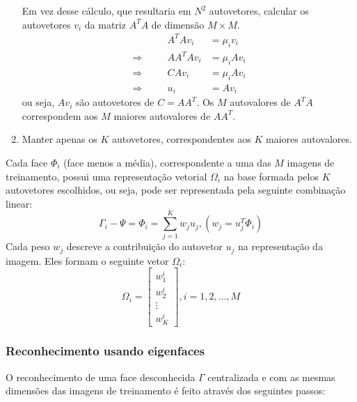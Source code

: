 \begin{enumerate}
    Em vez desse cálculo, que resultaria em $N^2$ autovetores, calcular os autovetores $v_i$ da matriz $A^TA$ de dimensão $M \times M$.
    \begin{equation} \label{eq:eign_autov}
    \begin{alignedat}{2}
                     && A^T Av_i    &= \mu_i v_i\\
    \Rightarrow\quad && AA^T Av_i   &= \mu_i Av_i\\
    \Rightarrow\quad && CAv_i       &= \mu_i Av_i\\
    \Rightarrow\quad && u_i         &= Av_i
    \end{alignedat}
    \end{equation}
    ou seja, $Av_i$ são autovetores de $C = AA^T$. Os $M$ autovalores de $A^TA$ correspondem aos $M$ maiores autovalores de $AA^T$.
    \item Manter apenas os $K$ autovetores, correspondentes aos $K$ maiores autovalores.
\end{enumerate}

Cada face $\Phi_i$ (face menos a média), correspondente a uma das $M$ imagens de treinamento, possui uma representação vetorial $\Omega_i$ na base formada pelos $K$ autovetores escolhidos, ou seja, pode ser representada pela seguinte combinação linear:
%
\begin{equation} \label{eq:eign_lincomb}
    \Gamma_i - \Psi = \Phi_i = \sum_{j=1}^{K}w_ju_j, (w_j = u_{j}^{T}\Phi_i)
\end{equation}
%
Cada peso $w_j$ descreve a contribuição do autovetor $u_j$ na representação da imagem. Eles formam o seguinte vetor $\Omega_i$:
%
\begin{equation} \label{eq:eign_lincomb_vetor}
\Omega_i = \begin{bmatrix}
        w_{1}^{i}\\ 
        w_{2}^{i}\\ 
        \vdots\\ 
        w_{K}^{i}
        \end{bmatrix}, i = 1, 2, \ldots, M
\end{equation}
%

\subsubsection{Reconhecimento usando eigenfaces}\label{sec:eigenfaces_reconhecimento}

O reconhecimento de uma face desconhecida $\Gamma$ centralizada e com as mesmas dimensões das imagens de treinamento é feito através dos seguintes passos:

